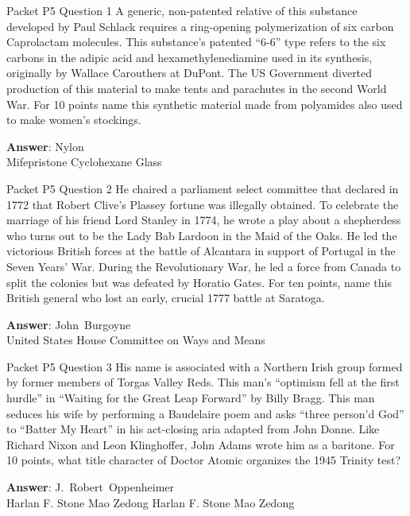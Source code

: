 \begin{frame}{Packet P5 Question 1}
A generic, non-patented   relative of this substance developed by Paul Schlack requires a ring-opening polymerization of six carbon Caprolactam   molecules. This substance’s patented “6-6” type refers to the six carbons in the adipic acid and hexamethylenediamine   used in its synthesis, originally by Wallace Carouthers at DuPont. The US Government   diverted production of this material to make tents and parachutes in the second   World War. For 10 points name this synthetic material made from polyamides also used to make women’s stockings.  

\textbf{Answer}: Nylon\\
 Mifepristone
 Cyclohexane
 Glass
\end{frame}

\begin{frame}{Packet P5 Question 2}
He chaired a parliament   select committee that declared in 1772 that Robert Clive's Plassey fortune was illegally obtained. To celebrate the marriage of his friend Lord Stanley in 1774, he wrote a play about a shepherdess who turns out to be the Lady Bab Lardoon in the Maid of the Oaks.  He led the victorious       British forces at the battle of Alcantara  in support of Portugal in the Seven Years' War.  During the Revolutionary War, he led a force from Canada to split the colonies but was defeated by Horatio Gates.  For ten points, name this British general who lost an early, crucial 1777 battle at Saratoga.  

\textbf{Answer}: John\ Burgoyne\\
 United States House Committee on Ways and Means
\end{frame}

\begin{frame}{Packet P5 Question 3}
His name is associated   with a Northern Irish group formed by former members of Torgas Valley Reds.  This man’s “optimism fell at the first hurdle” in ``Waiting for the Great Leap Forward'' by Billy Bragg.   This man seduces his wife by performing a Baudelaire poem and asks “three person’d God” to “Batter My Heart” in his act-closing aria adapted from John Donne. Like Richard Nixon and Leon Klinghoffer, John Adams wrote him as a baritone. For 10 points, what title character of Doctor Atomic organizes the   1945 Trinity test?      

\textbf{Answer}: J.\ Robert\ Oppenheimer\\
 Harlan F. Stone
 Mao Zedong
 Harlan F. Stone
 Mao Zedong
\end{frame}

